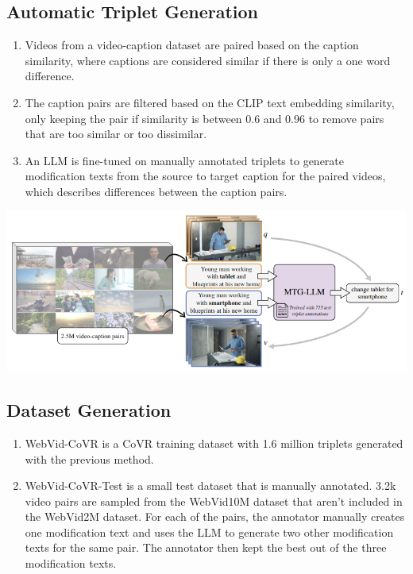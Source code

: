 \documentclass{article}
\begin{document}
\subsection*{Automatic Triplet Generation}
\begin{enumerate}
    \item Videos from a video-caption dataset are paired based on the caption similarity, where captions are considered similar if there is only a one word difference.
    \item The caption pairs are filtered based on the CLIP text embedding similarity, only keeping the pair if similarity is between 0.6 and 0.96 to remove pairs that are too similar or too dissimilar.
    \item An LLM is fine-tuned on manually annotated triplets to generate modification texts from the source to target caption for the paired videos, which describes differences between the caption pairs.
\end{enumerate}

\begin{center}
    \includegraphics[scale=0.5]{covr2-2.png}
\end{center}

\subsection*{Dataset Generation}
\begin{enumerate}
    \item WebVid-CoVR is a CoVR training dataset with 1.6 million triplets generated with the previous method.
    \item WebVid-CoVR-Test is a small test dataset that is manually annotated. 3.2k video pairs are sampled from the WebVid10M dataset that aren't included in the WebVid2M dataset. For each of the pairs, the annotator manually creates one modification text and uses the LLM to generate two other modification texts for the same pair. The annotator then kept the best out of the three modification texts.
\end{enumerate}
\end{document}
